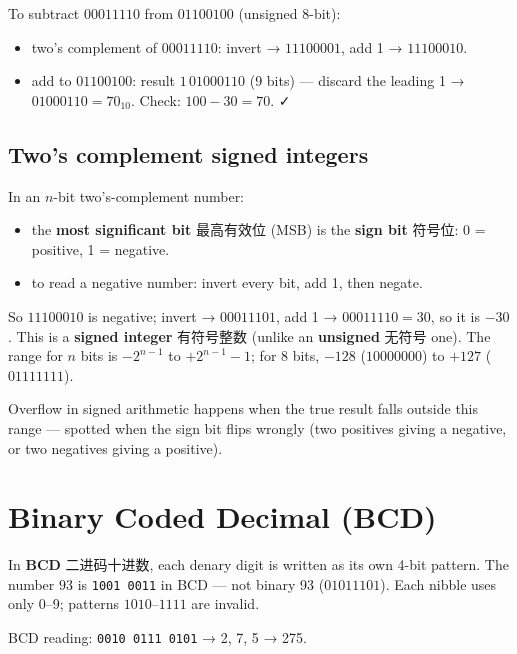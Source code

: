 \documentclass[11pt]{article}
\begin{document}
To subtract $00011110$ from $01100100$ (unsigned 8-bit):

\begin{itemize}
\item two's complement of $00011110$: invert → $11100001$, add 1 → $11100010$.

\item add to $01100100$: result $1\,01000110$ (9 bits) — discard the leading 1 → $01000110 = 70_{10}$. Check: $100 - 30 = 70$. ✓

\end{itemize}

\subsection*{Two's complement signed integers}

In an $n$-bit two's-complement number:

\begin{itemize}
\item the \textbf{most significant bit} 最高有效位 (MSB) is the \textbf{sign bit} 符号位: 0 = positive, 1 = negative.

\item to read a negative number: invert every bit, add 1, then negate.

\end{itemize}

So $11100010$ is negative; invert → $00011101$, add 1 → $00011110 = 30$, so it is $-30$. This is a \textbf{signed integer} 有符号整数 (unlike an \textbf{unsigned} 无符号 one). The range for $n$ bits is $-2^{n-1}$ to $+2^{n-1} - 1$; for 8 bits, $-128$ ($10000000$) to $+127$ ($01111111$).

Overflow in signed arithmetic happens when the true result falls outside this range — spotted when the sign bit flips wrongly (two positives giving a negative, or two negatives giving a positive).

\section*{Binary Coded Decimal (BCD)}

In \textbf{BCD} 二进码十进数, each denary digit is written as its own 4-bit pattern. The number $93$ is \texttt{1001 0011} in BCD — not binary 93 ($01011101$). Each nibble uses only 0–9; patterns $1010$–$1111$ are invalid.

BCD reading: \texttt{0010 0111 0101} → 2, 7, 5 → 275.
\end{document}
